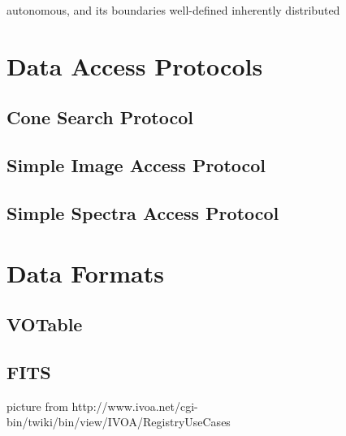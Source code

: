 autonomous, and its boundaries well-defined
inherently distributed

\section{Data Access Protocols}
\subsection{Cone Search Protocol}
\subsection{Simple Image Access Protocol}
\subsection{Simple Spectra Access Protocol}
\section{Data Formats}
\subsection{VOTable}
\subsection{FITS}



picture from
http://www.ivoa.net/cgi-bin/twiki/bin/view/IVOA/RegistryUseCases







